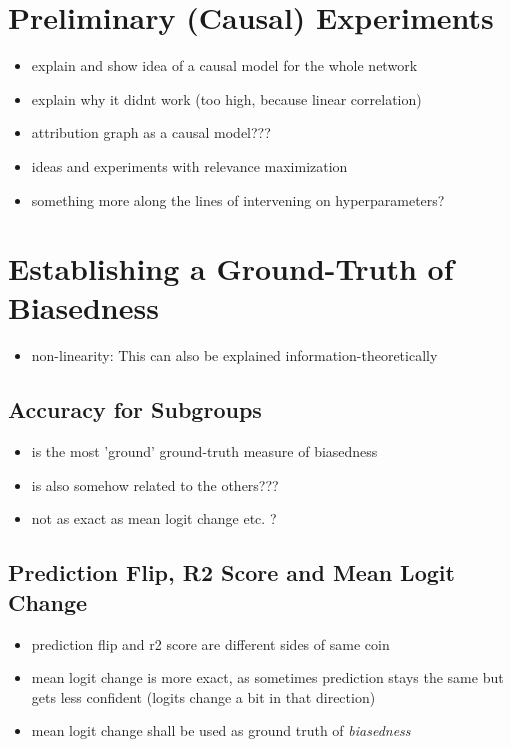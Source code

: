\section{Preliminary (Causal) Experiments} 
\begin{itemize}
    \item explain and show idea of a causal model for the whole network
    \item explain why it didnt work (too high, because linear correlation)
    \item attribution graph as a causal model???
    \item ideas and experiments with relevance maximization
    \item something more along the lines of intervening on hyperparameters? \cite{Karimi2023}
\end{itemize}

\section{Establishing a Ground-Truth of Biasedness}
\begin{itemize}
    \item non-linearity: This can also be explained information-theoretically 
\end{itemize}

\subsection{Accuracy for Subgroups}
\begin{itemize}
    \item is the most 'ground' ground-truth measure of biasedness
    \item is also somehow related to the others??? 
    \item not as exact as mean logit change etc. ?
\end{itemize}

\subsection{Prediction Flip, R2 Score and Mean Logit Change}
\begin{itemize}
    \item prediction flip and r2 score are different sides of same coin
    \item mean logit change is more exact, as sometimes prediction stays the same but gets less confident (logits change a bit in that direction)
    \item mean logit change shall be used as ground truth of \textit{biasedness}
\end{itemize}

